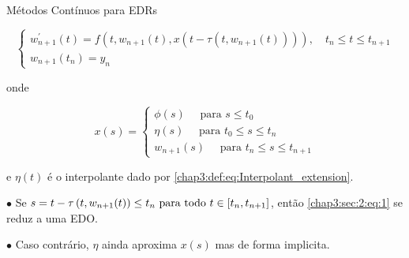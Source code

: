 \documentclass{beamer}
\theoremstyle{plain}
\theoremstyle{definition}
\begin{document}
\begin{frame}{Métodos Contínuos para EDRs}

    \footnotesize

    \begin{equation}
        \left\{\begin{array}{l}
                w_{n+1}^{\prime}(t)=f(t, w_{n+1}(t), x(t-\tau(t, w_{n+1}(t)))), \quad t_{n} \leq t \leq t_{n+1} \\
                w_{n+1}(t_{n})=y_{n}
        \end{array}\right.
        \label{chap3:sec:2:eq:1}
    \end{equation}

    onde

    $$
    x(s)=\left\{\begin{array}{l}
            \phi(s) \quad \text { para } s \leq t_{0} \\
            \eta(s) \quad \text { para } t_{0} \leq s \leq t_{n} \\
            w_{n+1}(s) \quad \text { para } t_{n} \leq s \leq t_{n+1}
    \end{array}\right.
    $$

    e \(\eta(t)\) é o interpolante dado por \ref{chap3:def:eq:Interpolant_extension}. 

    \phantom{aa} $\bullet$ Se \( s=t-\tau\left(t, w_{n+1}(t)\right) \leq t_{n}$ para todo $t \in\left[t_{n}, t_{n+1}\right]\), então \eqref{chap3:sec:2:eq:1} se reduz a uma EDO.
    
    \phantom{aa} $\bullet$ Caso contrário, $\eta$ ainda aproxima $x(s)$ mas de forma implicita.
\end{frame}


\end{document}

